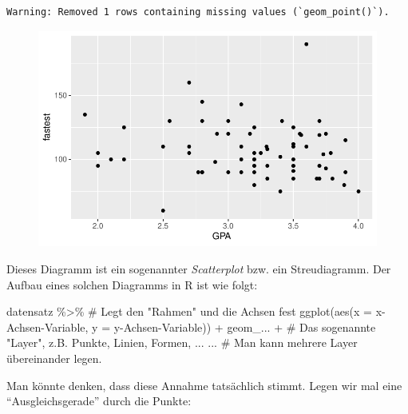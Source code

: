 \documentclass[
  letterpaper,
  DIV=11,
  numbers=noendperiod]{scrartcl}
\newenvironment{Shaded}{\begin{snugshade}}{\end{snugshade}}
\newcommand{\AttributeTok}[1]{\textcolor[rgb]{0.40,0.45,0.13}{#1}}
\newcommand{\CommentTok}[1]{\textcolor[rgb]{0.37,0.37,0.37}{#1}}
\newcommand{\FunctionTok}[1]{\textcolor[rgb]{0.28,0.35,0.67}{#1}}
\newcommand{\NormalTok}[1]{\textcolor[rgb]{0.00,0.23,0.31}{#1}}
\newcommand{\SpecialCharTok}[1]{\textcolor[rgb]{0.37,0.37,0.37}{#1}}
\begin{document}
\begin{verbatim}
Warning: Removed 1 rows containing missing values (`geom_point()`).
\end{verbatim}

\begin{figure}[H]

{\centering \includegraphics{05-visualisierung_files/figure-pdf/unnamed-chunk-3-1.pdf}

}

\end{figure}

Dieses Diagramm ist ein sogenannter \emph{Scatterplot} bzw. ein
Streudiagramm. Der Aufbau eines solchen Diagramms in R ist wie folgt:

\begin{Shaded}
\begin{Highlighting}[]
\NormalTok{datensatz }\SpecialCharTok{\%\textgreater{}\%} 
  \CommentTok{\# Legt den "Rahmen" und die Achsen fest}
  \FunctionTok{ggplot}\NormalTok{(}\FunctionTok{aes}\NormalTok{(}\AttributeTok{x =}\NormalTok{ x}\SpecialCharTok{{-}}\NormalTok{Achsen}\SpecialCharTok{{-}}\NormalTok{Variable, }\AttributeTok{y =}\NormalTok{ y}\SpecialCharTok{{-}}\NormalTok{Achsen}\SpecialCharTok{{-}}\NormalTok{Variable)) }\SpecialCharTok{+}
\NormalTok{  geom\_... }\SpecialCharTok{+} \CommentTok{\# Das sogenannte "Layer", z.B. Punkte, Linien, Formen, ...}
\NormalTok{  ... }\CommentTok{\# Man kann mehrere Layer übereinander legen.}
\end{Highlighting}
\end{Shaded}

Man könnte denken, dass diese Annahme tatsächlich stimmt. Legen wir mal
eine ``Ausgleichsgerade'' durch die Punkte:
\end{document}
